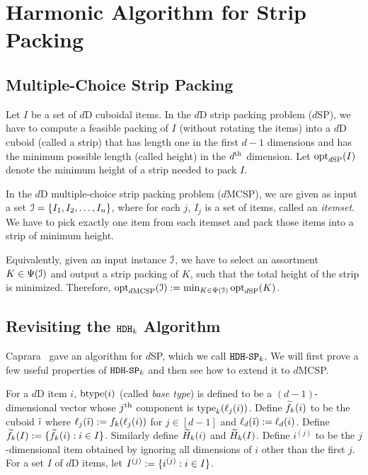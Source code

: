 \section{Harmonic Algorithm for Strip Packing}
\label{sec:hdhk-sp}

\subsection{Multiple-Choice Strip Packing}

Let $I$ be a set of $d$D cuboidal items.
In the $d$D strip packing problem ($d$SP), we have to compute
a feasible packing of $I$ (without rotating the items)
into a $d$D cuboid (called a strip) that has length one in the first $d-1$ dimensions
and has the minimum possible length (called height) in the $d^{\textrm{th}}$ dimension.
Let $\operatorname{opt}_{d\mathrm{SP}}(I)$ denote the minimum height of a strip needed to pack $I$.

In the $d$D multiple-choice strip packing problem ($d$MCSP),
we are given as input a set $\mathcal{I} = \{I_1, I_2, \ldots, I_n\}$,
where for each $j$, $I_j$ is a set of items, called an {\em itemset}.
We have to pick exactly one item from each itemset and pack those items
into a strip of minimum height.

Equivalently, given an input instance $\mathcal{I}$, we have to select an
assortment $K \in \Psi(\mathcal{I})$ and output a strip packing of $K$,
such that the total height of the strip is minimized. Therefore,
$\operatorname{opt}_{d\mathrm{MCSP}}(\mathcal{I}) := \min_{K \in \Psi(\mathcal{I})} \operatorname{opt}_{d\mathrm{SP}}(K)$.

\subsection{Revisiting the \texorpdfstring{$\operatorname{\mathtt{HDH}}_{k}$}{HDHk} Algorithm}

Caprara~\cite{caprara2008} gave an algorithm for $d$SP,
which we call $\operatorname{\mathtt{HDH-SP}}_{k}$.
We will first prove a few useful properties of $\operatorname{\mathtt{HDH-SP}}_{k}$
and then see how to extend it to $d$MCSP.

For a $d$D item $i$, $\operatorname{btype}(i)$ (called \emph{base type}) is defined to be
a $(d-1)$-dimensional vector whose $j^{\textrm{th}}$ component is $\operatorname{type}_k(\ell_j(i))$.
Define $\widetilde{f}_{k}(i)$ to be the cuboid $\tilde{\imath}$ where $\ell_j(\tilde{\imath}) := f_k(\ell_j(i))$
for $j \in [d-1]$ and $\ell_d(\tilde{\imath}) := \ell_d(i)$.
Define $\widetilde{f}_{k}(I) := \{\widetilde{f}_{k}(i): i \in I\}$.
Similarly define $\widetilde{H}_{k}(i)$ and $\widetilde{H}_{k}(I)$.
Define $i^{(j)}$ to be the $j$-dimensional item
obtained by ignoring all dimensions of $i$ other than the first $j$.
For a set $I$ of $d$D items, let $I^{(j)} := \{i^{(j)}: i \in I\}$.

